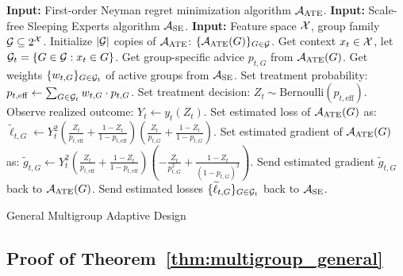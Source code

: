 \begin{algorithm}[ht]
\begin{algorithmic}
\STATE \textbf{Input:} First-order Neyman regret minimization algorithm $\mathcal{A}_\mathrm{ATE}$.
\STATE \textbf{Input:} Scale-free Sleeping Experts algorithm $\mathcal{A}_\mathrm{SE}$.
\STATE \textbf{Input:} Feature space $\mathcal{X}$, group family $\mathcal{G} \subseteq 2^{\mathcal{X}}$.
\STATE Initialize $|\mathcal{G}|$ copies of $\mathcal{A}_\mathrm{ATE}$: $\{\mathcal{A}_\mathrm{ATE}(G)\}_{G \in \mathcal{G}}$.
    \STATE Get context $x_t \in \mathcal{X}$, let $\mathcal{G}_t = \{G \in \mathcal{G} : x_t \in G \}$.
        \STATE Get group-specific advice $p_{t, G}$ from $\mathcal{A}_\mathrm{ATE}(G)$.
    \ENDFOR
    \STATE Get weights $\{w_{t, G}\}_{G \in \mathcal{G}_t}$ of active groups from $\mathcal{A}_\mathrm{SE}$.
    \STATE Set treatment probability: $p_{t, \mathrm{eff}} \gets \sum_{G \in \mathcal{G}_t} w_{t, G} \cdot p_{t, G}$.
    \STATE Set treatment decision: $Z_{t} \sim \mathrm{Bernoulli}(p_{t, \mathrm{eff}})$.
    \STATE Observe realized outcome: $Y_t \gets y_t(Z_{t})$.
        \STATE Set estimated loss of $\mathcal{A}_\mathrm{ATE}(G)$ as: 
        $\widetilde{\ell}_{t, G} \gets Y_t^2 \left( \frac{Z_{t}}{p_{t, \mathrm{eff}}} + \frac{1-Z_{t}}{1-p_{t, \mathrm{eff}}} \right) \left( \frac{Z_{t}}{p_{t, G}} + \frac{1-Z_{t}}{1-p_{t, G}} \right)$.
        \STATE Set estimated gradient of $\mathcal{A}_\mathrm{ATE}(G)$ as:
        $\widetilde{g}_{t, G} \gets Y_t^2 \left( \frac{Z_{t}}{p_{t, \mathrm{eff}}} + \frac{1-Z_{t}}{1-p_{t, \mathrm{eff}}} \right) \left( - \frac{Z_{t}}{p_{t, G}^2} + \frac{1-Z_{t}}{(1-p_{t, G})^2} \right)$.
        \STATE Send estimated gradient $\widetilde{g}_{t, G}$ back to $\mathcal{A}_\mathrm{ATE}(G)$.
    \ENDFOR   
    \STATE Send estimated losses $\{\widetilde{\ell}_{t, G}\}_{G \in \mathcal{G}_t}$ back to $\mathcal{A}_\mathrm{SE}$.
\ENDFOR
\end{algorithmic}
\caption{General Multigroup Adaptive Design}
\label{alg:multigroup_general}
\end{algorithm}










\subsection{Proof of Theorem~\ref{thm:multigroup_general}} \label{app:multigroup-proof}

